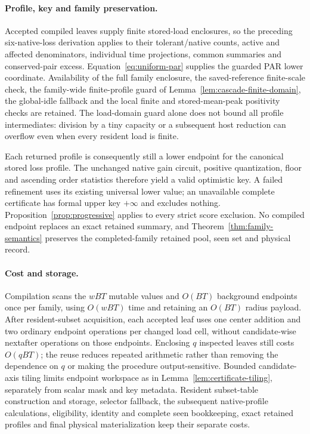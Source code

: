 \documentclass[11pt]{article}
\begin{document}
\paragraph{Profile, key and family preservation.}
Accepted compiled leaves supply finite stored-load enclosures, so the preceding six-native-loss derivation applies to their tolerant/native counts, active and affected denominators, individual time projections, common summaries and conserved-pair excess. Equation~\eqref{eq:uniform-par} supplies the guarded PAR lower coordinate. Availability of the full family enclosure, the saved-reference finite-scale check, the family-wide finite-profile guard of Lemma~\ref{lem:cascade-finite-domain}, the global-idle fallback and the local finite and stored-mean-peak positivity checks are retained. The load-domain guard alone does not bound all profile intermediates: division by a tiny capacity or a subsequent host reduction can overflow even when every resident load is finite.

Each returned profile is consequently still a lower endpoint for the canonical stored loss profile. The unchanged native gain circuit, positive quantization, floor and ascending order statistics therefore yield a valid optimistic key. A failed refinement uses its existing universal lower value; an unavailable complete certificate has formal upper key $+\infty$ and excludes nothing. Proposition~\ref{prop:progressive} applies to every strict score exclusion. No compiled endpoint replaces an exact retained summary, and Theorem~\ref{thm:family-semantics} preserves the completed-family retained pool, seen set and physical record.

\paragraph{Cost and storage.}
Compilation scans the $wBT$ mutable values and $O(BT)$ background endpoints once per family, using $O(wBT)$ time and retaining an $O(BT)$ radius payload. After resident-subset acquisition, each accepted leaf uses one center addition and two ordinary endpoint operations per changed load cell, without candidate-wise nextafter operations on those endpoints. Enclosing $q$ inspected leaves still costs $O(qBT)$; the reuse reduces repeated arithmetic rather than removing the dependence on $q$ or making the procedure output-sensitive. Bounded candidate-axis tiling limits endpoint workspace as in Lemma~\ref{lem:certificate-tiling}, separately from scalar mask and key metadata. Resident subset-table construction and storage, selector fallback, the subsequent native-profile calculations, eligibility, identity and complete seen bookkeeping, exact retained profiles and final physical materialization keep their separate costs.
\end{document}
